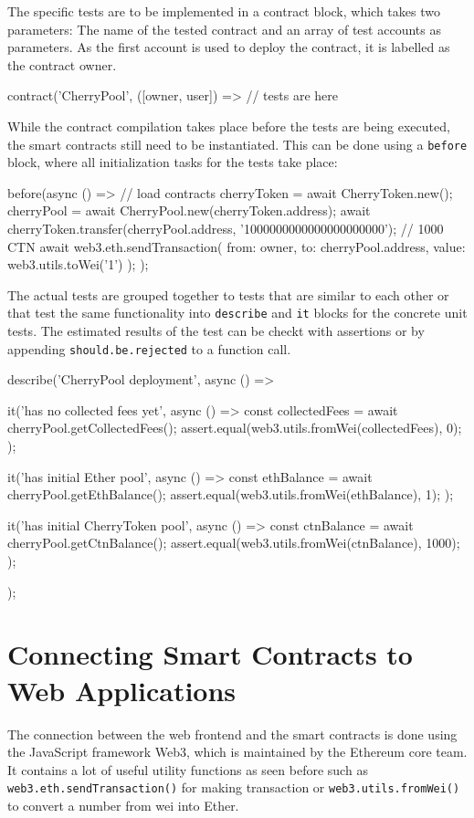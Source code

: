 The specific tests are to be implemented in a contract block, which takes two parameters: The name of the tested contract and an array of test accounts as parameters. As the first account is used to deploy the contract, it is labelled as the contract owner.

\begin{GenericCode}
contract('CherryPool', ([owner, user]) => {
	// tests are here
}	
\end{GenericCode}

While the contract compilation takes place before the tests are being executed, the smart contracts still need to be instantiated. This can be done using a \texttt{before} block, where all initialization tasks for the tests take place:

\begin{GenericCode}
before(async () => {
  // load contracts
  cherryToken = await CherryToken.new();
  cherryPool = await CherryPool.new(cherryToken.address);
  await cherryToken.transfer(cherryPool.address, '1000000000000000000000'); // 1000 CTN
  await web3.eth.sendTransaction({ from: owner, to: cherryPool.address, value: web3.utils.toWei('1') });
});	
\end{GenericCode}

The actual tests are grouped together to tests that are similar to each other or that test the same functionality into \texttt{describe} and \texttt{it} blocks for the concrete unit tests. The estimated results of the test can be checkt with assertions or by appending \texttt{should.be.rejected} to a function call.

\begin{GenericCode}
describe('CherryPool deployment', async () => {
  it('has no collected fees yet', async () => {
    const collectedFees = await cherryPool.getCollectedFees();
    assert.equal(web3.utils.fromWei(collectedFees), 0);
  });

  it('has initial Ether pool', async () => {
    const ethBalance = await cherryPool.getEthBalance();
    assert.equal(web3.utils.fromWei(ethBalance), 1);
  });

  it('has initial CherryToken pool', async () => {
    const ctnBalance = await cherryPool.getCtnBalance();
    assert.equal(web3.utils.fromWei(ctnBalance), 1000);
  });
});
\end{GenericCode}

\section{Connecting Smart Contracts to Web Applications}
The connection between the web frontend and the smart contracts is done using the JavaScript framework Web3\cite{Web3}, which is maintained by the Ethereum core team. It contains a lot of useful utility functions as seen before such as \texttt{web3.eth.sendTransaction()} for making transaction or \texttt{web3.utils.fromWei()} to convert a number from wei into Ether.

